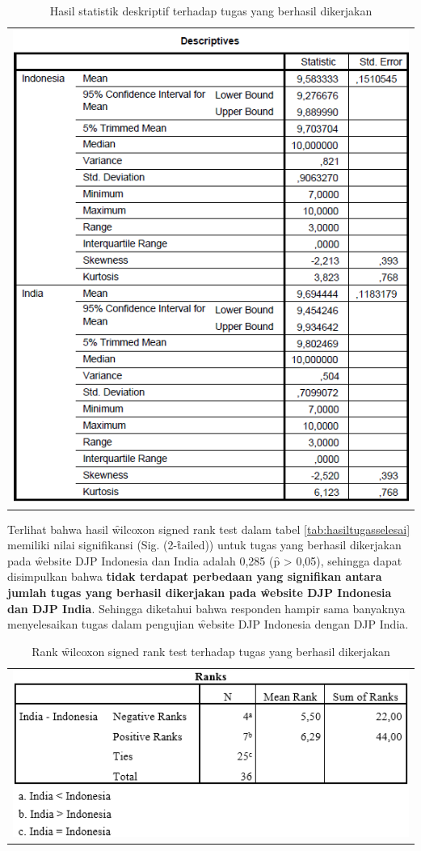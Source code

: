 \begin{table}
	\centering
	\caption{Hasil statistik deskriptif terhadap tugas yang berhasil dikerjakan}
	\label{tab:desctugasselesai}
	\begin{tabular}{c}
		\includegraphics[width=\textwidth]
		{pics/tugasselesaidesc.PNG}
	\end{tabular}
\end{table}
Terlihat bahwa hasil \f{wilcoxon signed rank test} dalam tabel \ref{tab:hasiltugasselesai} memiliki nilai signifikansi (Sig. (2-\f{tailed})) untuk tugas yang berhasil dikerjakan pada \f{website} DJP Indonesia dan India adalah 0,285 (\f{p} > 0,05), sehingga dapat disimpulkan bahwa \textbf{tidak terdapat perbedaan yang signifikan antara jumlah tugas yang berhasil dikerjakan pada \f{website} DJP Indonesia dan DJP India}. Sehingga diketahui bahwa responden hampir sama banyaknya menyelesaikan tugas dalam pengujian \f{website} DJP Indonesia dengan DJP India.
\begin{table}
	\centering
	\caption{Rank \f{wilcoxon signed rank test} terhadap tugas yang berhasil dikerjakan}
	\label{tab:ranktugasselesai}
	\begin{tabular}{c}
		\includegraphics[width=\textwidth]
		{pics/rankSelesai.PNG}
	\end{tabular}
\end{table}
